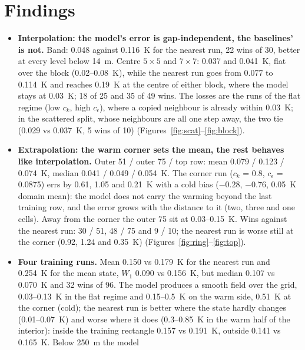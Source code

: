 \documentclass[11pt,a4paper]{article}
\begin{document}
\section{Findings}
\begin{itemize}
  \item \textbf{Interpolation: the model's error is gap-independent, the baselines' is not.} Band: 0.048 against
        \SI{0.116}{K} for the nearest run, 22 wins of 30, better at every level below \SI{14}{m}. Centre $5\times5$
        and $7\times7$: 0.037 and \SI{0.041}{K}, flat over the block (0.02--\SI{0.08}{K}), while the nearest run goes
        from 0.077 to \SI{0.114}{K} and reaches \SI{0.19}{K} at the centre of either block, where the model stays
        at \SI{0.03}{K}; 18 of 25 and 35 of 49 wins. The losses are the runs of the flat regime (low $c_k$, high
        $c_\epsilon$), where a copied neighbour is already within \SI{0.03}{K}; in the scattered split, whose
        neighbours are all one step away, the two tie (0.029 vs \SI{0.037}{K}, 5 wins of 10)
        (Figures~\ref{fig:scat}--\ref{fig:block}).
  \item \textbf{Extrapolation: the warm corner sets the mean, the rest behaves like interpolation.} Outer 51 /
        outer 75 / top row: mean 0.079 / 0.123 / \SI{0.074}{K}, median 0.041 / 0.049 / \SI{0.054}{K}. The corner run
        ($c_k$ = 0.8, $c_\epsilon$ = 0.0875) errs by 0.61, 1.05 and \SI{0.21}{K} with a cold bias ($-0.28$, $-0.76$,
        \SI{+0.05}{K} domain mean): the model does not carry the warming beyond the last training row, and the
        error grows with the distance to it (two, three and one cells). Away from the corner the outer 75 sit at
        0.03--\SI{0.15}{K}. Wins against the nearest run: 30 / 51, 48 / 75 and 9 / 10; the nearest run is worse
        still at the corner (0.92, 1.24 and \SI{0.35}{K}) (Figures~\ref{fig:ring}--\ref{fig:top}).
  \item \textbf{Four training runs.} Mean 0.150 vs \SI{0.179}{K} for the nearest run and \SI{0.254}{K} for the
        mean state, $W_1$ 0.090 vs \SI{0.156}{K}, but median 0.107 vs \SI{0.070}{K} and 32 wins of 96. The model
        produces a smooth field over the grid, 0.03--\SI{0.13}{K} in the flat regime and 0.15--\SI{0.5}{K} on the
        warm side, \SI{0.51}{K} at the corner (cold); the nearest run is better where the state hardly changes
        (0.01--\SI{0.07}{K}) and worse where it does (0.3--\SI{0.85}{K} in the warm half of the interior): inside
        the training rectangle 0.157 vs \SI{0.191}{K}, outside 0.141 vs \SI{0.165}{K}. Below \SI{250}{m} the model

\end{itemize}
\end{document}
